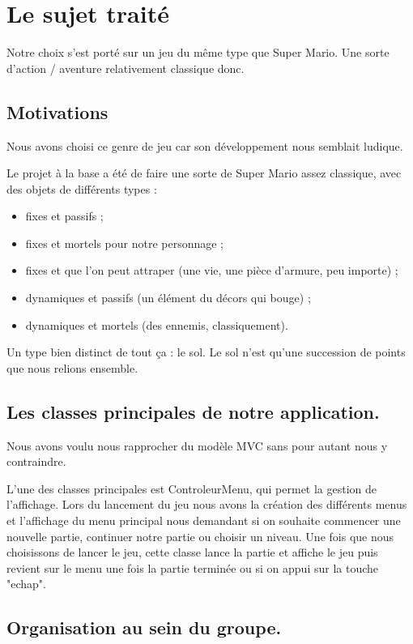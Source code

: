 \chapter{Le sujet traité}

Notre choix s'est porté sur un jeu du même type que Super Mario.
Une sorte d'action / aventure relativement classique donc.

\section{Motivations}

Nous avons choisi ce genre de jeu car son développement nous semblait ludique.

Le projet à la base a été de faire une sorte de Super Mario assez classique, avec des objets de différents types :
\begin{itemize}
	\item fixes et passifs ;
	\item fixes et mortels pour notre personnage ;
	\item fixes et que l'on peut attraper (une vie, une pièce d'armure, peu importe) ;
	\item dynamiques et passifs (un élément du décors qui bouge) ;
	\item dynamiques et mortels (des ennemis, classiquement).
\end{itemize}

Un type bien distinct de tout ça : le sol.
Le sol n'est qu'une succession de points que nous relions ensemble.


\section{Les classes principales de notre application.}

Nous avons voulu nous rapprocher du modèle MVC sans pour autant nous y contraindre.

L'une des classes principales est ControleurMenu, qui permet la gestion de l'affichage.
Lors du lancement du jeu nous avons la création des différents menus et l'affichage du menu principal nous demandant si on souhaite commencer une nouvelle partie,
continuer notre partie ou choisir un niveau.
Une fois que nous choisissons de lancer le jeu, cette classe lance la partie et affiche le jeu puis revient sur le menu une fois la partie terminée ou si on appui sur la touche "echap".

\clearpage


\section{Organisation au sein du groupe.}

